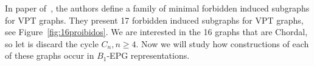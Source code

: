 \documentclass[9pt]{entcs}
\newtheorem{lema}{Lemma}[section]
\begin{document}
%

In paper of~\cite{alcon2015characterizing}, the authors define a family of minimal forbidden induced subgraphs for VPT graphs. They present 17 forbidden induced subgraphs for VPT graphs, see Figure~\ref{fig:16proibidos}. We are interested in the 16 graphs that are Chordal, so let is discard the cycle $C_n, n\geq4$. Now we will study how constructions of each of these graphs occur in $B_1$-EPG representations.







% 

\end{document}
